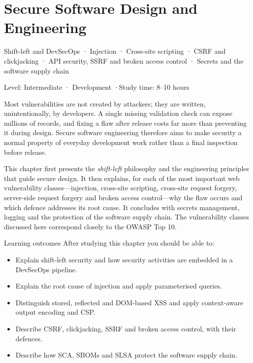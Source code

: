 \documentclass[11pt,openany]{book}
\newcommand{\chaptermeta}[3]{%
  {\sffamily\small\color{accent}#1\par}\vspace{0.3em}
  {\sffamily\footnotesize\color{gray}#2 \quad·\quad #3\par}\vspace{1.2em}}
\begin{document}
\chapter{Secure Software Design and Engineering}\label{ch:9}
\chaptermeta{Shift-left and DevSecOps · Injection · Cross-site scripting · CSRF and clickjacking · API security, SSRF and broken access control · Secrets and the software supply chain}{Level: Intermediate · Development}{Study time: 8–10 hours}

Most vulnerabilities are not created by attackers; they are written, unintentionally, by developers. A single missing validation check can expose millions of records, and fixing a flaw after release costs far more than preventing it during design. Secure software engineering therefore aims to make security a normal property of everyday development work rather than a final inspection before release.

This chapter first presents the \emph{shift-left} philosophy and the engineering principles that guide secure design. It then explains, for each of the most important web vulnerability classes—injection, cross-site scripting, cross-site request forgery, server-side request forgery and broken access control—why the flaw occurs and which defence addresses its root cause. It concludes with secrets management, logging and the protection of the software supply chain. The vulnerability classes discussed here correspond closely to the OWASP Top 10.

\begin{outcomesbox}{Learning outcomes}
After studying this chapter you should be able to:
\begin{itemize}
  \item Explain shift-left security and how security activities are embedded in a DevSecOps pipeline.
  \item Explain the root cause of injection and apply parameterised queries.
  \item Distinguish stored, reflected and DOM-based XSS and apply context-aware output encoding and CSP.
  \item Describe CSRF, clickjacking, SSRF and broken access control, with their defences.
  \item Describe how SCA, SBOMs and SLSA protect the software supply chain.
\end{itemize}
\end{outcomesbox}
\end{document}
